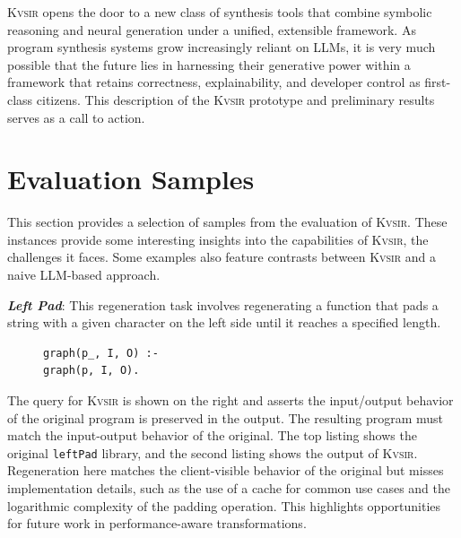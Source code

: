 \documentclass[sigplan,review,anonymous,10pt]{acmart}
\newcommand{\sys}{{\scshape Kv{\textalpha}sir}\xspace}
\newcommand{\heading}[1]{\vspace{2pt}\noindent\textbf{\emph{#1}}:\enspace}
\newcommand{\ttt}[1]{\texttt{#1}\xspace}
\begin{document}

\sys opens the door to a new class of synthesis tools that combine symbolic
reasoning and neural generation under a unified, extensible framework.
As program synthesis systems grow increasingly reliant on LLMs, it is very much possible that the
future lies in harnessing their generative power within a framework that retains
correctness, explainability, and developer control as first-class citizens.
This description of the \sys prototype and preliminary results serves 
as a call to action.





\appendix

\section{Evaluation Samples}
\label{appendix:samples}
This section provides a selection of samples from the evaluation of \sys.
These instances provide some interesting insights into the capabilities of \sys, the challenges it faces.
Some examples also feature contrasts between \sys and a naive LLM-based approach.

\heading{Left Pad}
This regeneration task involves regenerating a
function that pads a string with a given character on the left side until it
reaches a specified length.

\begin{figure}
\begin{verbatim}
graph(p_, I, O) :-
graph(p, I, O).
\end{verbatim}
\end{figure}
The query for \sys is shown on the right and asserts the input/output behavior of the
original program is preserved in the output.
The resulting program must match the input-output behavior of the original.
The top listing shows the original \ttt{leftPad} library, and the second listing shows the output
of \sys.
Regeneration here matches the client-visible behavior of the original but misses
implementation details, such as the use of a cache for common
use cases and the logarithmic complexity of the padding operation.
This highlights opportunities for future work in performance-aware transformations.
\end{document}
